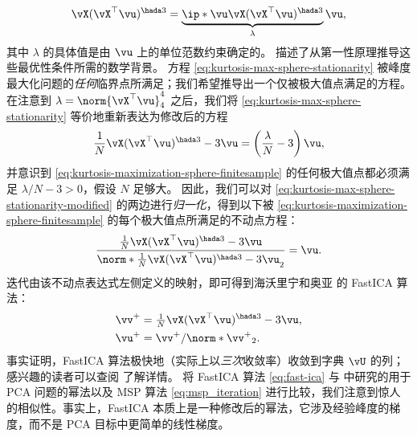 \documentclass[../../book-main_zh.tex]{subfiles}
\begin{document}
\begin{align}\label{eq:kurtosis-max-sphere-stationarity}
    \vX (\vX^\top \vu)^{\hada 3}
    =
    \underbrace{
        \ip*{\vu}{
            \vX (\vX^\top \vu)^{\hada 3}
    }}_{\lambda} \vu,
\end{align}
其中 $\lambda$ 的具体值是由 $\vu$ 上的单位范数约束确定的。
 描述了从第一性原理推导这些最优性条件所需的数学背景。
方程 \eqref{eq:kurtosis-max-sphere-stationarity}
被峰度最大化问题的\textit{任何}临界点所满足；我们希望推导出一个仅被极大值点满足的方程。
在注意到 $\lambda = \norm{\vX^\top \vu}_4^4$ 之后，我们将
\eqref{eq:kurtosis-max-sphere-stationarity} 等价地重新表达为修改后的方程
\begin{align}\label{eq:kurtosis-max-sphere-stationarity-modified}
    \frac{1}{N}\vX (\vX^\top \vu)^{\hada 3}
    -
    3 \vu
    =
    \left(
        \frac{\lambda}{N} - 3
    \right)
    \vu,
\end{align}
并意识到 \eqref{eq:kurtosis-maximization-sphere-finitesample}
的任何极大值点都必须满足 $\lambda / N - 3 > 0$，假设 $N$ 足够大。
因此，我们可以对 \eqref{eq:kurtosis-max-sphere-stationarity-modified}
的两边进行\textit{归一化}，得到以下被
\eqref{eq:kurtosis-maximization-sphere-finitesample} 的每个极大值点所满足的不动点方程：
\begin{align}\label{eq:kurtosis-max-sphere-fxp}
    \frac{
        \frac{1}{N}\vX (\vX^\top \vu)^{\hada 3}
        -
        3 \vu
    }{
        \norm*{
            \frac{1}{N}\vX (\vX^\top \vu)^{\hada 3}
            -
            3 \vu
        }_2
    }
    =
    \vu.
\end{align}
迭代由该不动点表达式左侧定义的映射，即可得到海沃里宁和奥亚 \cite{hyvarinen-1997} 的 FastICA 算法：
\begin{equation}
    \begin{split}\label{eq:fast-ica}
        \vv^+ &= \tfrac{1}{N}\vX (\vX^\top \vu)^{\hada 3}- 3 \vu
        ,  \\
        \vu^+ &= \vv^+ / \norm*{\vv^+}_2.
    \end{split}
\end{equation}
事实证明，FastICA 算法极快地（实际上以\textit{三次}收敛率）收敛到字典 $\vU$ 的列；感兴趣的读者可以查阅
\cite{hyvarinen-1997} 了解详情。
将 FastICA 算法 \eqref{eq:fast-ica} 与  中研究的用于 PCA 问题的幂法以及
MSP 算法 \eqref{eq:msp_iteration} 进行比较，我们注意到惊人的相似性。事实上，FastICA
本质上是一种修改后的幂法，它涉及经验峰度的梯度，而不是 PCA 目标中更简单的线性梯度。
\end{document}

